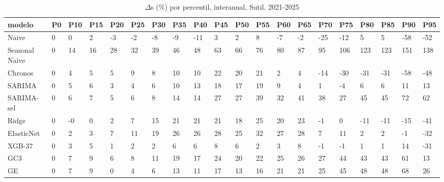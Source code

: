 \begin{table}[H]
\centering
\small
\caption{$\Delta$s (\%) por percentil, interanual, Sutil, 2021-2025}
\label{tab:T_barrido_delta_s_interanual_sutil}
\begin{tabular}{llllllllllllllllllll}
\toprule
modelo & P0 & P10 & P15 & P20 & P25 & P30 & P35 & P40 & P45 & P50 & P55 & P60 & P65 & P70 & P75 & P80 & P85 & P90 & P95 \\
\midrule
Naive & 0 & 0 & 2 & -3 & -2 & -8 & -9 & -11 & 3 & 2 & 8 & -7 & -2 & -25 & -12 & 5 & 5 & -58 & -52 \\
Seasonal Naive & 0 & 14 & 16 & 28 & 32 & 39 & 46 & 48 & 63 & 66 & 76 & 80 & 87 & 95 & 106 & 123 & 123 & 151 & 138 \\
Chronos & 0 & 4 & 5 & 5 & 9 & 8 & 10 & 10 & 22 & 20 & 21 & 2 & 4 & -14 & -30 & -31 & -31 & -58 & -48 \\
SARIMA & 0 & 5 & 6 & 3 & 4 & 6 & 10 & 13 & 18 & 17 & 19 & 9 & 4 & 1 & -4 & 6 & 6 & 11 & 13 \\
SARIMA-sel & 0 & 6 & 7 & 5 & 6 & 8 & 14 & 14 & 27 & 27 & 39 & 32 & 41 & 38 & 27 & 45 & 45 & 72 & 62 \\
Ridge & 0 & -0 & 0 & 2 & 7 & 15 & 21 & 21 & 21 & 18 & 25 & 20 & 23 & -1 & 0 & -11 & -11 & -15 & -41 \\
ElasticNet & 0 & 2 & 3 & 7 & 11 & 19 & 26 & 26 & 28 & 25 & 32 & 27 & 28 & 7 & 11 & 2 & 2 & -1 & -32 \\
XGB-37 & 0 & 3 & 5 & 1 & 2 & 2 & 6 & 6 & 8 & 6 & 2 & 3 & 8 & -1 & -1 & 1 & 1 & 14 & -31 \\
GC3 & 0 & 7 & 9 & 6 & 8 & 11 & 19 & 17 & 24 & 20 & 22 & 25 & 26 & 27 & 44 & 43 & 43 & 61 & 13 \\
GE & 0 & 7 & 9 & 0 & 4 & 6 & 13 & 11 & 17 & 13 & 16 & 21 & 21 & 25 & 45 & 48 & 48 & 68 & 26 \\
\bottomrule
\end{tabular}
\end{table}